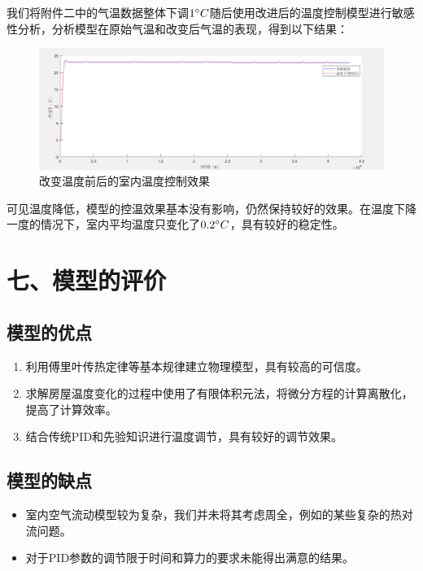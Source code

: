 \documentclass{my_paper}
\begin{document}
我们将附件二中的气温数据整体下调$1\degree C$随后使用改进后的温度控制模型进行敏感性分析，分析模型在原始气温和改变后气温的表现，得到以下结果：
\begin {figure}[h]
\centering %
\includegraphics[width=\textwidth]{ming.png}
\caption{改变温度前后的室内温度控制效果} %
\label{five}
\end {figure}

可见温度降低，模型的控温效果基本没有影响，仍然保持较好的效果。在温度下降一度的情况下，室内平均温度只变化了$0.2\degree C$，具有较好的稳定性。

\section{七、模型的评价}

\subsection{模型的优点}
\begin{enumerate}
    \item 利用傅里叶传热定律等基本规律建立物理模型，具有较高的可信度。
    \item 求解房屋温度变化的过程中使用了有限体积元法，将微分方程的计算离散化，提高了计算效率。
    \item 结合传统PID和先验知识进行温度调节，具有较好的调节效果。

\end{enumerate}

\subsection{模型的缺点}
\begin{itemize}
    \item 室内空气流动模型较为复杂，我们并未将其考虑周全，例如的某些复杂的热对流问题。
    \item 对于PID参数的调节限于时间和算力的要求未能得出满意的结果。

\end{itemize}
\end{document}
